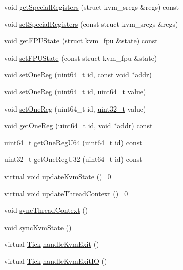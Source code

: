 \begin{DoxyCompactItemize}
\item 
void \hyperlink{classBaseKvmCPU_a5b5f3c0a541efb9b8567a5e835421c15}{getSpecialRegisters} (struct kvm\_\-sregs \&regs) const 
\item 
void \hyperlink{classBaseKvmCPU_aefaac43fa62903f42a68a637083d5f09}{setSpecialRegisters} (const struct kvm\_\-sregs \&regs)
\item 
void \hyperlink{classBaseKvmCPU_a9fdafd736b7b9ef041b6c3e4768a61d6}{getFPUState} (struct kvm\_\-fpu \&state) const 
\item 
void \hyperlink{classBaseKvmCPU_a31b5d1e73edb46a17fa0a8ddd29e7604}{setFPUState} (const struct kvm\_\-fpu \&state)
\item 
void \hyperlink{classBaseKvmCPU_ad96695f9596f808056054f3c2026b818}{setOneReg} (uint64\_\-t id, const void $\ast$addr)
\item 
void \hyperlink{classBaseKvmCPU_a0f8ff23affd5f22fc47c4d00e6d24979}{setOneReg} (uint64\_\-t id, uint64\_\-t value)
\item 
void \hyperlink{classBaseKvmCPU_ab70d563942fa831d4de5da7d94ba8064}{setOneReg} (uint64\_\-t id, \hyperlink{Type_8hh_a435d1572bf3f880d55459d9805097f62}{uint32\_\-t} value)
\item 
void \hyperlink{classBaseKvmCPU_ab5a47c64ebf5a4de2539c6f71f7acc51}{getOneReg} (uint64\_\-t id, void $\ast$addr) const 
\item 
uint64\_\-t \hyperlink{classBaseKvmCPU_a803c633f6b9fc380a376a5a6d2ca17ee}{getOneRegU64} (uint64\_\-t id) const 
\item 
\hyperlink{Type_8hh_a435d1572bf3f880d55459d9805097f62}{uint32\_\-t} \hyperlink{classBaseKvmCPU_abb51d3ccd07e153be4d5982c324a95bc}{getOneRegU32} (uint64\_\-t id) const 
\item 
virtual void \hyperlink{classBaseKvmCPU_a48817be7bf03ef44cc5114ecf4df9b27}{updateKvmState} ()=0
\item 
virtual void \hyperlink{classBaseKvmCPU_ac47bfb587580ca76050e0c9bc753c10d}{updateThreadContext} ()=0
\item 
void \hyperlink{classBaseKvmCPU_a5d4ee3823af24f9210efb370a4c8ce93}{syncThreadContext} ()
\item 
void \hyperlink{classBaseKvmCPU_a8633407bfc3732fef1f78ef60345873d}{syncKvmState} ()
\item 
virtual \hyperlink{base_2types_8hh_a5c8ed81b7d238c9083e1037ba6d61643}{Tick} \hyperlink{classBaseKvmCPU_ab7dc26d4e02dbccc343942dd7a3ed7d8}{handleKvmExit} ()
\item 
virtual \hyperlink{base_2types_8hh_a5c8ed81b7d238c9083e1037ba6d61643}{Tick} \hyperlink{classBaseKvmCPU_a404fbd80d6676724d026a932b2258dc7}{handleKvmExitIO} ()

\end{DoxyCompactItemize}
